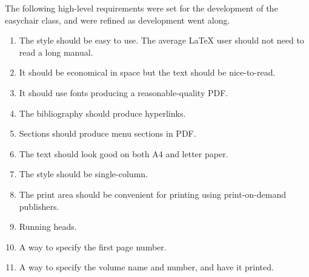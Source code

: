 \documentclass[]{easychair}
\newcommand{\easychair}{\textsf{easychair}}
\begin{document}
The following high-level requirements were set for the development of 
the {\easychair} class, and were refined as development went along.

\begin{enumerate}
\item
The style should be easy to use. 
The average {\LaTeX} user should not need to read a long manual.

\item
It should be economical in space but the text should be nice-to-read.

\item
It should use fonts producing a reasonable-quality PDF.

\item
The bibliography should produce hyperlinks.

\item
Sections should produce menu sections in PDF.

\item
The text should look good on both A4 and letter paper.

\item
The style should be single-column.

\item
The print area should be convenient for printing using print-on-demand publishers.

\item
Running heads.

\item
A way to specify the first page number.

\item
A way to specify the volume name and number, and have it printed.
\end{enumerate}



\end{document}
